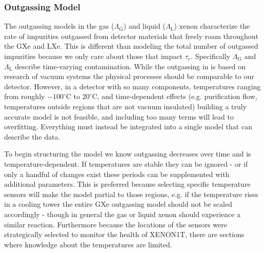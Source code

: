 \subsubsection{Outgassing Model}
\label{subsubsec:electron_lifetime_model_outgassing_model}
The outgassing models in the gas ($\Lambda_{\mathrm{G}}$) and liquid ($\Lambda_{\mathrm{L}}$) xenon characterize the rate of impurities
outgassed
from detector materials that freely roam throughout the GXe and LXe.  This is different than modeling the total number of outgassed
impurities because we only care about those that impact $\tau_e$.  Specifically $\Lambda_{\mathrm{G}}$ and $\Lambda_{\mathrm{L}}$
describe time-varying contamination.  While the outgassing in
 is based on research of vacuum systems the physical processes should be
comparable to our detector.  However, in a detector with so
many components, temperatures ranging from roughly $-100^{\circ} \mathrm{C}$ to $20^{\circ} \mathrm{C}$, and time-dependent effects (e.g.
purification flow, temperatures outside regions that are not vacuum insulated) building a truly accurate model is not
feasible, and including too many terms will lead to overfitting.  Everything must instead be integrated into a single model that can
describe the data.

To begin structuring the model we know outgassing decreases over time and is temperature-dependent.  If temperatures
are stable they can be ignored - or if only a handful of changes exist these periods can be supplemented with
additional parameters.  This is preferred because selecting specific temperature sensors will make the model
partial to those regions, e.g. if the temperature rises in a cooling tower the entire GXe outgassing model should not be scaled
accordingly - though in general the gas or liquid xenon should experience a similar reaction.  Furthermore because the locations of the
sensors were strategically selected to monitor the health of XENON1T, there are sections where knowledge about the temperatures are
limited.

